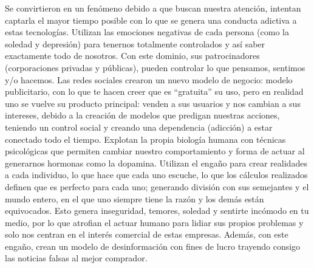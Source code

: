 \documentclass[a0paper,portrait,margin=0pt, colspace=24pt,subcolspace=0pt,blockverticalspace=36pt,innermargin=50pt]{tikzposter}
\begin{document}
\begin{columns}
{        	Se convirtieron en un fenómeno debido a que buscan nuestra atención, intentan captarla el mayor tiempo posible con lo que se genera una conducta adictiva a estas tecnologías. Utilizan las emociones negativas de cada persona (como la soledad y depresión) para tenernos totalmente controlados y así saber exactamente todo de nosotros. Con este dominio, sus patrocinadores (corporaciones privadas y públicas), pueden controlar lo que pensamos, sentimos y/o hacemos. Las redes sociales crearon un nuevo modelo de negocio: modelo publicitario, con lo que te hacen creer que es ``gratuita'' su uso, pero en realidad uno se vuelve su producto principal: venden a sus usuarios y nos cambian a sus intereses, debido a la creación de modelos que predigan nuestras acciones, teniendo un control social y creando una dependencia (adicción) a estar conectado todo el tiempo. Explotan la propia biología humana con técnicas psicológicas que permiten cambiar nuestro comportamiento y forma de actuar al generarnos hormonas como la dopamina. Utilizan el engaño para crear realidades a cada individuo, lo que hace que cada uno escuche, lo que los cálculos realizados definen que es perfecto para cada uno; generando división con sus semejantes y el mundo entero, en el que uno siempre tiene la razón y los demás están equivocados. Esto genera inseguridad, temores, soledad y sentirte incómodo en tu medio, por lo que atrofian el actuar humano para lidiar sus propios problemas y solo nos centran en el interés comercial de estas empresas. Además, con este engaño, crean un modelo de desinformación con fines de lucro trayendo consigo las noticias falsas al mejor comprador.
        }
        

\end{columns}
\end{document}
